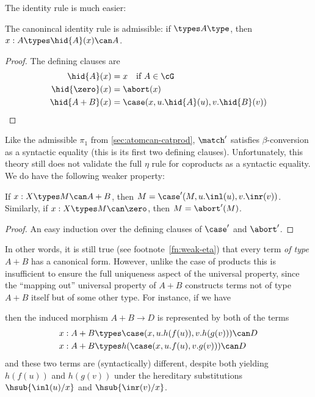 The identity rule is much easier:

\begin{thm}\label{thm:atomcan-catcoprod-idadm}
  The canonincal identity rule is admissible: if $\types A\type$, then $x:A \types \hid{A}(x)\can A$.
\end{thm}
\begin{proof}
  The defining clauses are
  \begin{align*}
    \hid{A}(x) &= x \quad\text{if }A\in \cG\\
    \hid{\zero}(x) &= \abort(x)\\
    \hid{A+B}(x) &= \case(x,u.\hid{A}(u),v.\hid{B}(v))\qedhere
  \end{align*}
\end{proof}

Like the admissible $\pi_1$ from \cref{sec:atomcan-catprod}, $\match'$ satisfies $\beta$-conversion as a syntactic equality (this is its first two defining clauses).
Unfortunately, this theory still does not validate the full $\eta$ rule for coproducts as a syntactic equality.
We do have the following weaker property:

\begin{lem}\label{thm:atomcan-catcoprod-weaketa}
  If $x:X \types M\can A+B$, then $M = \case'(M,u.\inl(u),v.\inr(v))$.
  Similarly, if $x:X\types M\can\zero$, then $M=\abort'(M)$.
\end{lem}
\begin{proof}
  An easy induction over the defining clauses of $\case'$ and $\abort'$.
\end{proof}

In other words, it is still true (see footnote~\ref{fn:weak-eta}) that every term \emph{of type $A+B$} has a canonical form.
However, unlike the case of products this is insufficient to ensure the full uniqueness aspect of the universal property, since the ``mapping out'' universal property of $A+B$ constructs terms not of type $A+B$ itself but of some other type.
For instance, if we have
then the induced morphism $A+B\to D$ is represented by both of the terms
\begin{align*}
  x:A+B &\types \case(x,u.h(f(u)),v.h(g(v)))\can D\\
  x:A+B &\types h(\case(x,u.f(u),v.g(v)))\can D
\end{align*}
and these two terms are (syntactically) different, despite both yielding $h(f(u))$ and $h(g(v))$ under the hereditary substitutions $\hsub{\inl(u)/x}$ and $\hsub{\inr(v)/x}$.

